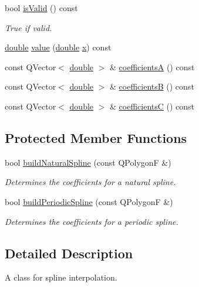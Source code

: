 \begin{DoxyCompactItemize}
bool \hyperlink{class_qwt_spline_a8eb42cf7f0f81bb7b7b885466f8ebbbf}{is\-Valid} () const 
\begin{DoxyCompactList}\small\item\em True if valid. \end{DoxyCompactList}\item 
\hyperlink{_super_l_u_support_8h_a8956b2b9f49bf918deed98379d159ca7}{double} \hyperlink{class_qwt_spline_a1f67187eefe2959f0c902532edf64d41}{value} (\hyperlink{_super_l_u_support_8h_a8956b2b9f49bf918deed98379d159ca7}{double} \hyperlink{glext_8h_a1db9d104e3c2128177f26aff7b46982f}{x}) const 
\item 
const Q\-Vector$<$ \hyperlink{_super_l_u_support_8h_a8956b2b9f49bf918deed98379d159ca7}{double} $>$ \& \hyperlink{class_qwt_spline_abbc5c1cf6016fc57050f379250da031e}{coefficients\-A} () const 
\item 
const Q\-Vector$<$ \hyperlink{_super_l_u_support_8h_a8956b2b9f49bf918deed98379d159ca7}{double} $>$ \& \hyperlink{class_qwt_spline_a1de897d6cc2d0d8dac840d15d0bb603e}{coefficients\-B} () const 
\item 
const Q\-Vector$<$ \hyperlink{_super_l_u_support_8h_a8956b2b9f49bf918deed98379d159ca7}{double} $>$ \& \hyperlink{class_qwt_spline_a27d51429a7447b18a8f05a44b3418f89}{coefficients\-C} () const 
\end{DoxyCompactItemize}
\subsection*{Protected Member Functions}
\begin{DoxyCompactItemize}
\item 
bool \hyperlink{class_qwt_spline_a1cdf09e841dd6a721eb788914273c484}{build\-Natural\-Spline} (const Q\-Polygon\-F \&)
\begin{DoxyCompactList}\small\item\em Determines the coefficients for a natural spline. \end{DoxyCompactList}\item 
bool \hyperlink{class_qwt_spline_a8184717f8c018e69fabd1e33ac68ef19}{build\-Periodic\-Spline} (const Q\-Polygon\-F \&)
\begin{DoxyCompactList}\small\item\em Determines the coefficients for a periodic spline. \end{DoxyCompactList}\end{DoxyCompactItemize}


\subsection{Detailed Description}
A class for spline interpolation. 

